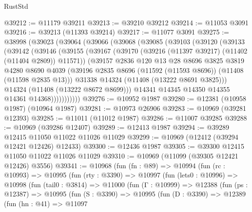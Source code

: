 \begin{lexlean}{RustStd}
\begin{coremodule}
@39212 := @11179 @39211
@39213 := @39210 @39212
@39214 := @11053 @3091
@39216 := @39213 (@11393 @39214)
@39217 := @11077 @3091
@39275 := @38998
    (@39023
      (@39064
        (@39066
          (@39068
            (@39085
              (@39103
                (@39120
                  (@39133
                    (@39142
                      (@39146
                        (@39155
                          (@39167
                            (@39170 (@39216 (@11397 @39217) (@11402 (@11404 @2809)) @11571))
                            (@39157
                              @2836
                              @120
                              @13
                              @28
                              @8696
                              @3825
                              @3819
                              @4280
                              @8690
                              @4039
                              (@39196
                                @2835
                                @8696
                                (@11592 (@11593 @8696))
                                (@11408 (@11598 @2835 @13)))
                              @31338
                              @14324
                              (@11408 (@13222 @8691 @3825)))
                            @14324
                            (@11408 (@13222 @8672 @8699)))
                          @14341
                          @14345
                          @14350
                          @14355
                          @14361
                          @14368)))))))))))
@39276 := @10952 @1987
@39280 := @12381 (@10958 @1987) (@10964 @1987)
@39281 := @10973 @26906
@39283 := @10969 (@39281 @12393)
@39285 := @11011 (@11012 @1987)
@39286 := @11007 @39285
@39288 := @10969 (@39286 @12407)
@39289 := @12413 @1987
@39294 := @39289 @12415 @11050 @11022 @11026 @11029
@39299 := @10969 (@12412 (@39294 @12421 @12426) @12433)
@39300 := @12436 @1987
@39305 := @39300 @12415 @11050 @11022 @11026 @11029
@39310 := @10969 (@11099 (@39305 @12421 @12426) @3556)
@39341 := @10968
    (fun (fn : @89) =>
    @10994
      (fun (rc : @10993) =>
      @10995
        (fun (rty : @3390) =>
        @10997
          (fun (lets0 : @10996) =>
          @10998
            (fun (tail0 : @3814) =>
            @11000
              (fun (Γ : @10999) =>
              @12388
                (fun (ps : @12387) =>
                @10995
                  (fun (S : @3390) =>
                  @10995
                    (fun (D : @3390) =>
                    @12389
                      (fun (hn : @41) =>
                      @11097

\end{coremodule}
\end{lexlean}
